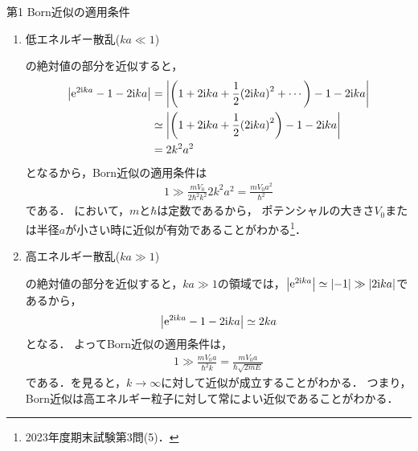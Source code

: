 \documentclass{report}
\begin{document}
\begin{myex}{第1 Born近似の適用条件}{}
    \begin{enumerate}
      \item 低エネルギー散乱($ka \ll 1$)\par
        の絶対値の部分を近似すると，
        \begin{align}
          \abs{\mathrm{e}^{2\mathrm{i} ka} - 1 - 2\mathrm{i} ka} &= \abs{\qty(1 + 2\mathrm{i} ka + \frac{1}{2}\qty(2 \mathrm{i} ka)^2 + \cdots) - 1 - 2\mathrm{i} ka}\\
          &\simeq \abs{\qty(1 + 2\mathrm{i} ka + \frac{1}{2}\qty(2 \mathrm{i} ka)^2) - 1 - 2\mathrm{i} ka} \\
          &= 2k^2 a^2
        \end{align}
        となるから，Born近似の適用条件は
        \begin{align}
          1 \gg \frac{mV_0}{2 \hbar^2 k^2}2k^2 a^2 = \frac{mV_0 a^2}{\hbar^2}\label{born-low-energy}
        \end{align}
        である．
        において，$m$と$\hbar$は定数であるから，
        ポテンシャルの大きさ$V_0$または半径$a$が小さい時に近似が有効であることがわかる\footnote{2023年度期末試験第3問(5)．}．
      \item 高エネルギー散乱($ka \gg 1$)\par
        の絶対値の部分を近似すると，$ka \gg 1$の領域では，$\abs{\mathrm{e}^{2\mathrm{i} ka}} \simeq \abs{-1} \gg \abs{2\mathrm{i} ka}$であるから，
        \begin{align}
          \abs{\mathrm{e}^{2\mathrm{i} ka} - 1 - 2\mathrm{i} ka} \simeq 2ka
        \end{align}
        となる．
        よってBorn近似の適用条件は，
        \begin{align}
          1 \gg \frac{mV_0 a}{\hbar^2 k} = \frac{mV_0a}{\hbar\sqrt{2mE}}\label{born-high-energy}
        \end{align}
        である．を見ると，$k\to\infty$に対して近似が成立することがわかる．
        つまり，Born近似は高エネルギー粒子に対して常によい近似であることがわかる．
    \end{enumerate}
  \end{myex}
\end{document}
